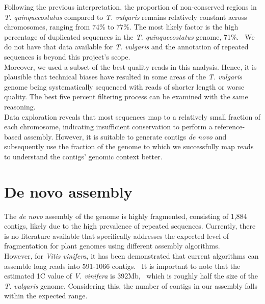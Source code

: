 Following the previous interpretation, the proportion of non-conserved regions in \textit{T. quinquecostatus} compared to \textit{T. vulgaris} remains relatively constant across chromosomes, ranging from 74\% to 77\%. The most likely factor is the high percentage of duplicated sequences in the \textit{T. quinquecostatus} genome,  71\%.~\cite{sunChromosomelevelAssemblyAnalysis2022} We do not have that data available for \textit{T. vulgaris} and the annotation of repeated sequences is beyond this project's scope. \\

Moreover, we used a subset of the best-quality reads in this analysis. Hence, it is plausible that technical biases have resulted in some areas of the \textit{T. vulgaris} genome being systematically sequenced with reads of shorter length or worse quality. The best five percent filtering process can be examined with the same reasoning.\\

Data exploration reveals that most sequences map to a relatively small fraction of each chromosome, indicating insufficient conservation to perform a reference-based assembly. However, it is suitable to generate contigs \textit{de novo} and subsequently use the fraction of the genome to which we successfully map reads to understand the contigs' genomic context better.\\ 

\section*{De novo assembly}

The \textit{de novo} assembly of the genome is highly fragmented, consisting of 1,884 contigs, likely due to the high prevalence of repeated sequences. Currently, there is no literature available that specifically addresses the expected level of fragmentation for plant genomes using different assembly algorithms.\\

However, for \textit{Vitis vinifera}, it has been demonstrated that current algorithms can assemble long reads into 591-1066 contigs.~\cite{huangAlignGraph2SimilarGenomeassisted2021} It is important to note that the estimated 1C value of \textit{V. vinifera} is 392Mb,~\cite{PlantDNACvalues} which is roughly half the size of the \textit{T. vulgaris} genome. Considering this, the number of contigs in our assembly falls within the expected range.\\

